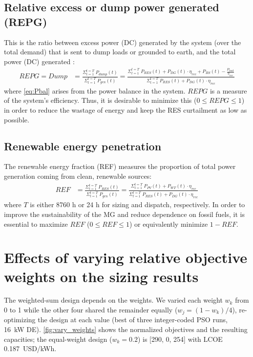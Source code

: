\documentclass[final,3p,times]{elsarticle}
\begin{document}
\subsection{Relative excess or dump power generated (REPG)}

This is the ratio between excess power (DC) generated by the system (over the total demand) that is sent to dump loads or grounded to earth, and the total power (DC) generated \cite{kaabeche2011b}:
\begin{align}
    REPG = Dump & = \frac{\Sigma_{t=1}^{t=T} \; P_{dump}(t)}{\Sigma_{t=1}^{t=T} \; P_{gen}(t)} = \frac{\Sigma_{t=1}^{t=T} \; P_{RES}(t) + P_{DG}(t) \cdot \eta_{rec} + P_{BS}(t) - \frac{P_{load}}{\eta_{inv}}}{\Sigma_{t=1}^{t=T} \; P_{RES}(t) + P_{DG}(t) \cdot \eta_{rec}} \label{eq:Pbal}
\end{align}
where \cref{eq:Pbal} arises from the power balance in the system. $REPG$ is a measure of the system's efficiency. Thus, it is desirable to minimize this ($0 \leq REPG \leq 1$) in order to reduce the wastage of energy and keep the RES curtailment as low as possible. 

\subsection{Renewable energy penetration}
The renewable energy fraction (REF) measures the proportion of total power generation coming from clean, renewable sources:
\begin{align}
    REF & = \frac{\Sigma_{t=1}^{t=T} \; P_{RES}(t)}{\Sigma_{t=1}^{t=T} \; P_{gen}(t)} = \frac{\Sigma_{t=1}^{t=T} \; P_{PV}(t) + P_{WT}(t) \cdot \eta_{rec}}{\Sigma_{t=1}^{t=T} \; P_{RES}(t) + P_{DG}(t) \cdot \eta_{rec}}
\end{align}
where $T$ is either 8760 h or 24 h for sizing and dispatch, respectively. In order to improve the sustainability of the MG and reduce dependence on fossil fuels, it is essential to maximize $REF$ ($0 \leq REF \leq 1$) or equivalently minimize $1-REF$. 

\section{Effects of varying relative objective weights on the sizing results \label{app:weights}}

The weighted-sum design depends on the weights. We varied each weight $w_k$ from 0 to 1 while the other four shared the remainder equally ($w_j = (1-w_k)/4$), re-optimizing the design at each value (best of three integer-coded PSO runs, 16~kW DE). \cref{fig:vary_weights} shows the normalized objectives and the resulting capacities; the equal-weight design ($w_k = 0.2$) is [290, 0, 254] with LCOE 0.187~USD/kWh.
\end{document}
